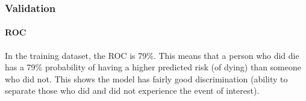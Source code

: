 \documentclass[
]{article}
\begin{document}
\hypertarget{validation}{%
\subsubsection{Validation}\label{validation}}

\hypertarget{roc}{%
\paragraph{ROC}\label{roc}}

In the training dataset, the ROC is 79\%. This means that a person who
did die has a 79\% probability of having a higher predicted risk (of
dying) than someone who did not. This shows the model has fairly good
discrimination (ability to separate those who did and did not experience
the event of interest).
\end{document}
